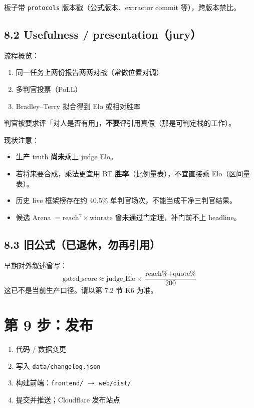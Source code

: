 \documentclass[11pt,a4paper]{article}
\begin{document}
板子带 \texttt{protocols} 版本戳（公式版本、extractor commit 等），跨版本禁比。

\subsection{8.2 Usefulness / presentation（jury）}

流程概览：
\begin{enumerate}[leftmargin=1.8em]
  \item 同一任务上两份报告两两对战（常做位置对调）
  \item 多判官投票（PoLL）
  \item Bradley--Terry 拟合得到 Elo 或相对胜率
\end{enumerate}

判官被要求评「对人是否有用」，\textbf{不要}评引用真假（那是可判定栈的工作）。

现状注意：
\begin{itemize}[leftmargin=1.5em]
  \item 生产 truth \textbf{尚未}乘上 judge Elo。
  \item 若将来要合成，乘法更宜用 BT \textbf{胜率}（比例量表），不宜直接乘 Elo（区间量表）。
  \item 历史 live 框架榜存在约 40.5\% 单判官场次，不能当成干净三判官结果。
  \item 候选 Arena $=\text{reach}^{\gamma}\times\text{winrate}$ 曾未通过门定理，补门前不上 headline。
\end{itemize}

\subsection{8.3 旧公式（已退休，勿再引用）}

早期对外叙述曾写：
\[
\text{gated\_score} \approx \text{judge\_Elo}\times\frac{\text{reach\%}+\text{quote\%}}{200}
\]
这已不是当前生产口径。请以第 7.2 节 K6 为准。

\section{第 9 步：发布}

\begin{enumerate}[leftmargin=1.8em]
  \item 代码 / 数据变更
  \item 写入 \texttt{data/changelog.json}
  \item 构建前端：\texttt{frontend/} $\rightarrow$ \texttt{web/dist/}
  \item 提交并推送；Cloudflare 发布站点
\end{enumerate}
\end{document}
